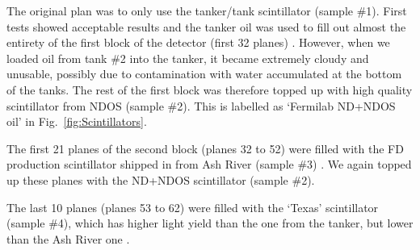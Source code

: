 
The original plan \cite{NOvA-doc-34196} was to only use the tanker/tank scintillator (sample \#1). First tests showed acceptable results and the tanker oil was used to fill out almost the entirety of the first block of the detector (first 32 planes) \cite{NOvA-doc-38349}. However, when we loaded oil from tank \#2 into the tanker, it became extremely cloudy and unusable, possibly due to contamination with water accumulated at the bottom of the tanks. The rest of the first block was therefore topped up with high quality scintillator from \gls{NDOS} (sample \#2). This is labelled as `\gls{Fermilab} \gls{ND}+\gls{NDOS} oil' in Fig.~\ref{fig:Scintillators}.





The first 21 planes of the second block (planes 32 to 52) were filled with the \gls{FD} production scintillator shipped in from Ash River (sample \#3) \cite{NOvA-doc-41961}. We again topped up these planes with the \gls{ND}+\gls{NDOS} scintillator (sample \#2).

The last 10 planes (planes 53 to 62) \cite{NOvA-doc-41961} were filled with the `Texas' scintillator (sample \#4), which has higher light yield than the one from the tanker, but lower than the Ash River one \cite{NOvA-doc-38740}.

